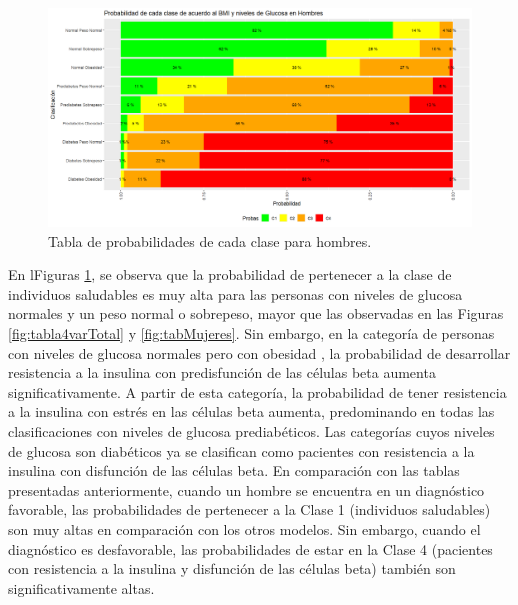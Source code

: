 \begin{figure}[H]
    \centering
    \includegraphics[height = 10 cm, width = 0.9 \textwidth]{4img/tablaH.png}
    \caption{Tabla de probabilidades de cada clase para hombres.}
    \label{fig:tabla4varHom}
\end{figure}

En lFiguras \ref{fig:tabla4varHom}, se observa que la probabilidad de pertenecer a la clase de individuos saludables es muy alta para las personas con niveles de glucosa normales y un peso normal o sobrepeso, mayor que las observadas en las Figuras \ref{fig:tabla4varTotal} y \ref{fig:tabMujeres}. Sin embargo, en la categoría de personas con niveles de glucosa normales pero con obesidad , la probabilidad de desarrollar resistencia a la insulina con predisfunción de las células beta aumenta significativamente. A partir de esta categoría, la probabilidad de tener resistencia a la insulina con estrés en las células beta aumenta, predominando en todas las clasificaciones con niveles de glucosa prediabéticos. Las categorías cuyos niveles de glucosa son diabéticos ya se clasifican como pacientes con resistencia a la insulina con disfunción de las células beta. En comparación con las tablas presentadas anteriormente, cuando un hombre se encuentra en un diagnóstico favorable, las probabilidades de pertenecer a la Clase 1 (individuos saludables) son muy altas en comparación con los otros modelos. Sin embargo, cuando el diagnóstico es desfavorable, las probabilidades de estar en la Clase 4 (pacientes con resistencia a la insulina y disfunción de las células beta) también son significativamente altas.



